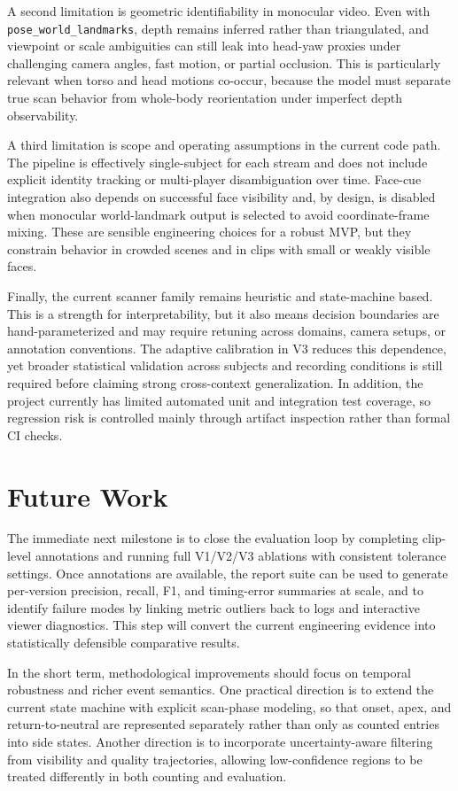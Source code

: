 \documentclass[11pt,a4paper]{article}
\begin{document}
A second limitation is geometric identifiability in monocular video. Even with \texttt{pose\_world\_landmarks}, depth remains inferred rather than triangulated, and viewpoint or scale ambiguities can still leak into head-yaw proxies under challenging camera angles, fast motion, or partial occlusion. This is particularly relevant when torso and head motions co-occur, because the model must separate true scan behavior from whole-body reorientation under imperfect depth observability.

A third limitation is scope and operating assumptions in the current code path. The pipeline is effectively single-subject for each stream and does not include explicit identity tracking or multi-player disambiguation over time. Face-cue integration also depends on successful face visibility and, by design, is disabled when monocular world-landmark output is selected to avoid coordinate-frame mixing. These are sensible engineering choices for a robust MVP, but they constrain behavior in crowded scenes and in clips with small or weakly visible faces.

Finally, the current scanner family remains heuristic and state-machine based. This is a strength for interpretability, but it also means decision boundaries are hand-parameterized and may require retuning across domains, camera setups, or annotation conventions. The adaptive calibration in V3 reduces this dependence, yet broader statistical validation across subjects and recording conditions is still required before claiming strong cross-context generalization. In addition, the project currently has limited automated unit and integration test coverage, so regression risk is controlled mainly through artifact inspection rather than formal CI checks.

\section{Future Work}
The immediate next milestone is to close the evaluation loop by completing clip-level annotations and running full V1/V2/V3 ablations with consistent tolerance settings. Once annotations are available, the report suite can be used to generate per-version precision, recall, F1, and timing-error summaries at scale, and to identify failure modes by linking metric outliers back to logs and interactive viewer diagnostics. This step will convert the current engineering evidence into statistically defensible comparative results.

In the short term, methodological improvements should focus on temporal robustness and richer event semantics. One practical direction is to extend the current state machine with explicit scan-phase modeling, so that onset, apex, and return-to-neutral are represented separately rather than only as counted entries into side states. Another direction is to incorporate uncertainty-aware filtering from visibility and quality trajectories, allowing low-confidence regions to be treated differently in both counting and evaluation.
\end{document}
